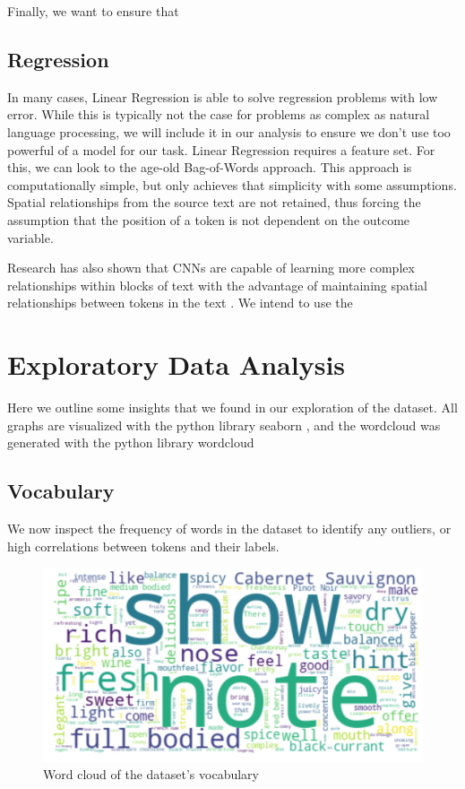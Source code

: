 \documentclass[11pt]{article}
\begin{document}
    Finally, we want to ensure that 
    
\subsection{Regression}
    In many cases, Linear Regression is able to solve regression problems with low error. While this is typically not the case for problems as complex as natural language processing, we will include it in our analysis to ensure we don't use too powerful of a model for our task. Linear Regression requires a feature set. For this, we can look to the age-old Bag-of-Words approach\cite{bag_of_words}. This approach is computationally simple, but only achieves that simplicity with some assumptions. Spatial relationships from the source text are not retained, thus forcing the assumption that the position of a token is not dependent on the outcome variable.\par
    Research has also shown that CNNs are capable of learning more complex relationships within blocks of text with the advantage of maintaining spatial relationships between tokens in the text \cite{cnn}. We intend to use the 
    


\section{Exploratory Data Analysis}
    Here we outline some insights that we found in our exploration of the dataset. All graphs are visualized with the python library seaborn \cite{seaborn}, and the wordcloud was generated with the python library wordcloud \cite{wordcloud}

\subsection{Vocabulary}
    We now inspect the frequency of words in the dataset to identify any outliers, or high correlations between tokens and their labels.

    \begin{figure}
    \centering
    \includegraphics[width=\textwidth]{wordcloud}
    \caption{Word cloud of the dataset's vocabulary}
    \end{figure}
\end{document}
